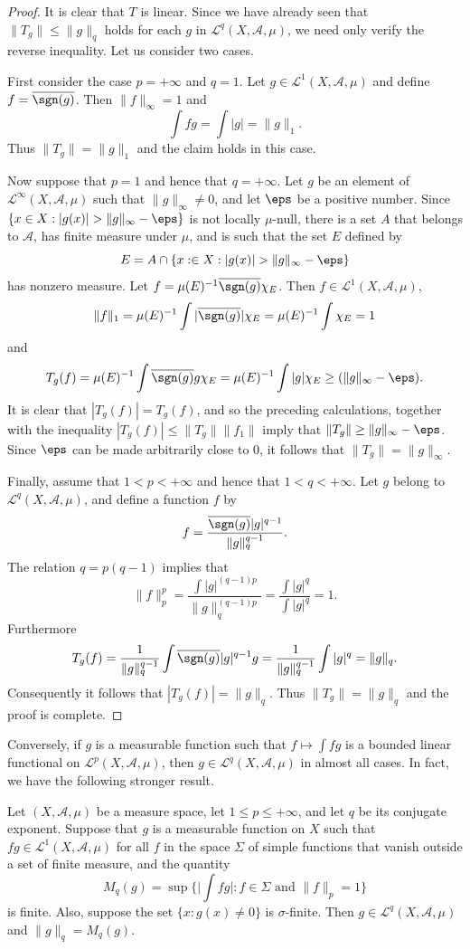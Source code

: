 \begin{proof}
It is clear that $T$ is linear. Since we have already seen that $\|T_g\|\leq\|g\|_q$ holds for each $g$ in $\mathcal{L}^q(X,\mathcal{A},\mu)$, we need only verify the reverse inequality. Let us consider two cases.\par
First consider the case $p=+\infty$ and $q=1$. Let $g\in\mathcal{L}^1(X,\mathcal{A},\mu)$ and define $f=\overline{\sgn(g)}$. Then $\|f\|_\infty=1$ and
\[\int fg=\int|g|=\|g\|_1.\]
Thus $\|T_g\|=\|g\|_1$ and the claim holds in this case.\par
Now suppose that $p=1$ and hence that $q=+\infty$. Let $g$ be an element of $\mathcal{L}^\infty(X,\mathcal{A},\mu)$ such that $\|g\|_\infty\neq 0$, and let $\eps$ be a positive number. Since $\{x\in X:|g(x)|>\|g\|_\infty-\eps\}$ is not locally $\mu$-null, there is a set $A$ that belongs to $\mathcal{A}$, has finite measure under $\mu$, and is such that the set $E$ defined by
\[E=A\cap\{x:\in X:|g(x)|>\|g\|_\infty-\eps\}\]
has nonzero measure. Let $f=\mu(E)^{-1}\overline{\sgn(g)}\chi_E$. Then $f\in\mathcal{L}^1(X,\mathcal{A},\mu)$,
\[\|f\|_1=\mu(E)^{-1}\int|\overline{\sgn(g)}|\chi_E=\mu(E)^{-1}\int\chi_E=1\]
and
\[T_g(f)=\mu(E)^{-1}\int\overline{\sgn(g)}g\chi_E=\mu(E)^{-1}\int|g|\chi_E\geq(\|g\|_\infty-\eps).\]
It is clear that $|T_g(f)|=T_g(f)$, and so the preceding calculations, together with the inequality $|T_g(f)|\leq\|T_g\|\|f_1\|$ imply that $\|T_g\|\geq\|g\|_\infty-\eps$. Since $\eps$ can be made arbitrarily close to $0$, it follows that $\|T_g\|=\|g\|_\infty$.\par
Finally, assume that $1<p<+\infty$ and hence that $1<q<+\infty$. Let $g$ belong to $\mathcal{L}^q(X,\mathcal{A},\mu)$, and define a function $f$ by \[f=\frac{\overline{\sgn(g)}|g|^{q-1}}{\|g\|_q^{q-1}}.\]
The relation $q=p(q-1)$ implies that 
\[\|f\|_p^p=\frac{\int|g|^{(q-1)p}}{\|g\|_q^{(q-1)p}}=\frac{\int|g|^q}{\int|g|^q}=1.\]
Furthermore
\[T_g(f)=\frac{1}{\|g\|_q^{q-1}}\int\overline{\sgn(g)}|g|^{q-1}g=\frac{1}{\|g\|_q^{q-1}}\int|g|^q=\|g\|_q.\]
Consequently it follows that $|T_g(f)|=\|g\|_q$. Thus $\|T_g\|=\|g\|_q$ and the proof is complete.
\end{proof}
Conversely, if $g$ is a measurable function such that $f\mapsto\int fg$ is a bounded linear functional on $\mathcal{L}^p(X,\mathcal{A},\mu)$, then $g\in\mathcal{L}^q(X,\mathcal{A},\mu)$ in almost all cases. In fact, we have the following stronger result.
\begin{proposition}\label{L^p functional generate by L^q if}
Let $(X,\mathcal{A},\mu)$ be a measure space, let $1\leq p\leq +\infty$, and let $q$ be its conjugate exponent. Suppose that $g$ is a measurable function on $X$ such that $fg\in\mathcal{L}^1(X,\mathcal{A},\mu)$ for all $f$ in the space $\Sigma$ of simple functions that vanish outside a set of finite measure, and the quantity
\[M_q(g)=\sup\{\Big|\int fg\Big|:f\in\Sigma\text{ and }\|f\|_p=1\}\]
is finite. Also, suppose the set $\{x:g(x)\neq 0\}$ is $\sigma$-finite. Then $g\in\mathcal{L}^q(X,\mathcal{A},\mu)$ and $\|g\|_q=M_q(g)$.
\end{proposition}

